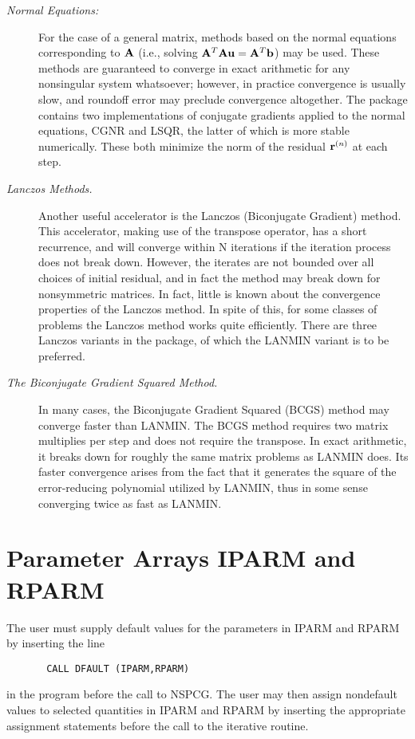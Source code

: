 \begin{description}

\item[{\sl Normal Equations:}]
For the case of a general matrix, methods based on the normal equations 
corresponding to ${\bf A}$ (i.e., solving ${\bf A}^T{\bf A} {\bf u}={\bf A}^T{\bf b}$) may
be used.  These methods are guaranteed to converge in exact arithmetic 
for any nonsingular system whatsoever; however, in practice convergence 
is usually slow, and roundoff error may preclude convergence altogether.  
The package contains two implementations of conjugate gradients applied
to the normal equations, CGNR and LSQR, the latter of which is more 
stable numerically.  These both minimize the norm of the residual
${\bf r}^{(n)}$ at each step.

\item[{\sl Lanczos Methods.}]
Another useful accelerator is the Lanczos (Biconjugate
Gradient) method.  This accelerator, making use of the transpose
operator, has a short recurrence, and will converge within N
iterations if the iteration process does not break down.  However, the
iterates are not bounded over all choices of initial residual,
and in fact the method may break down
for nonsymmetric matrices.  In fact, little is known about the
convergence properties of the Lanczos method.  In spite of this,
for some classes of problems the Lanczos method works quite
efficiently.  There are three Lanczos variants in the package,
of which the LANMIN variant is to be preferred.

\item[{\sl The Biconjugate Gradient Squared Method.}]
In many cases, the Biconjugate Gradient Squared (BCGS) \newline method 
may converge faster than LANMIN.  The BCGS method requires two 
matrix multiplies per step and does not require the transpose.  In 
exact arithmetic, it breaks down for roughly the same matrix problems 
as LANMIN does.  Its faster convergence arises from the fact that it 
generates the square of the error-reducing polynomial utilized by 
LANMIN, thus in some sense converging twice as fast as LANMIN.
\end{description}
 
\newpage
\section{Parameter Arrays IPARM and RPARM}
\label{params}
\indent
 
   The user must supply default values for the parameters in IPARM
and RPARM by inserting the line
\begin{verbatim}
       CALL DFAULT (IPARM,RPARM)
\end{verbatim}
in the program before the call to NSPCG.  The user may then assign
nondefault values to selected quantities in IPARM and RPARM by
inserting the appropriate assignment statements before the call to
the iterative routine.
 
